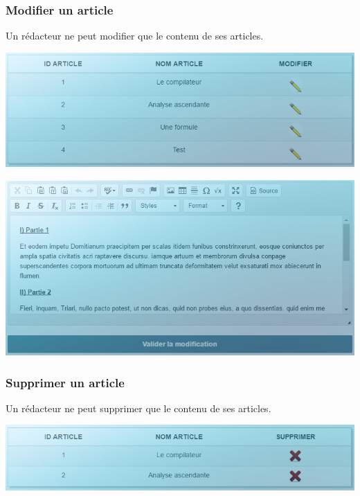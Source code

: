 \documentclass[hidelinks, 12pt,a4paper]{article}
\begin{document}
\subsubsection{Modifier un article}
Un rédacteur ne peut modifier que le contenu de ses articles.\\

\begin{center}
\includegraphics[width=16cm]{images/modifart.png}\\
\end{center}

\begin{center}
\includegraphics[width=16cm]{images/modifart2.png}\\
\end{center}


\subsubsection{Supprimer un article}
Un rédacteur ne peut supprimer que le contenu de ses articles.\\
\begin{center}
\includegraphics[width=16cm]{images/suppart.png}\\
\end{center}
\end{document}
